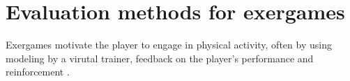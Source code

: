 \chapter{Evaluation methods for exergames}


Exergames motivate the player to engage in physical activity, often by using modeling by a virutal trainer, feedback on the player's performance and reinforcement \cite{lyons13strategies}.



	

  		
